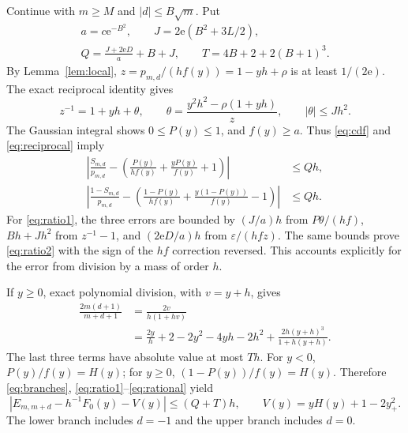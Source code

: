 \documentclass[11pt]{amsart}
\newcommand{\ee}{\mathrm e}
\begin{document}
Continue with $m\ge M$ and $|d|\le B\sqrt m$. Put
\begin{equation}\label{eq:Q}
 \begin{gathered}
 a=c\ee^{-B^2},\qquad J=2\ee(B^2+3L/2),\\
 Q=\frac{J+2\ee D}{a}+B+J,\qquad
 T=4B+2+2(B+1)^3.
 \end{gathered}
\end{equation}
By Lemma~\ref{lem:local},
$z=p_{m,d}/(hf(y))=1-yh+\rho$ is at least $1/(2\ee)$.
The exact reciprocal identity gives
\begin{equation}\label{eq:reciprocal}
 z^{-1}=1+yh+\theta,\qquad
 \theta=\frac{y^2h^2-\rho(1+yh)}{z},\qquad
 |\theta|\le Jh^2.
\end{equation}
The Gaussian integral shows $0\le P(y)\le1$, and $f(y)\ge a$.
Thus \eqref{eq:cdf} and \eqref{eq:reciprocal} imply
\begin{align}
 \left|\frac{S_{m,d}}{p_{m,d}}
 -\left(\frac{P(y)}{hf(y)}+\frac{yP(y)}{f(y)}+1\right)\right|
 &\le Qh,\label{eq:ratio1}\\
 \left|\frac{1-S_{m,d}}{p_{m,d}}
 -\left(\frac{1-P(y)}{hf(y)}+\frac{y(1-P(y))}{f(y)}-1\right)\right|
 &\le Qh.\label{eq:ratio2}
\end{align}
For \eqref{eq:ratio1}, the three errors are bounded by
$(J/a)h$ from $P\theta/(hf)$, $Bh+Jh^2$ from $z^{-1}-1$, and
$(2\ee D/a)h$ from $\varepsilon/(hfz)$. The same bounds prove
\eqref{eq:ratio2} with the sign of the $hf$ correction reversed.
This accounts explicitly for the error from division by a mass of
order $h$.

If $y\ge0$, exact polynomial division, with $v=y+h$, gives
\begin{equation}\label{eq:rational}
 \begin{split}
 \frac{2m(d+1)}{m+d+1}
 &=\frac{2v}{h(1+hv)}\\
 &=\frac{2y}{h}+2-2y^2
       -4yh-2h^2+\frac{2h(y+h)^3}{1+h(y+h)}.
 \end{split}
\end{equation}
The last three terms have absolute value at most $Th$.
For $y<0$, $P(y)/f(y)=H(y)$; for $y\ge0$,
$(1-P(y))/f(y)=H(y)$. Therefore \eqref{eq:branches},
\eqref{eq:ratio1}--\eqref{eq:rational} yield
\begin{equation}\label{eq:grid}
 \left|E_{m,m+d}-h^{-1}F_0(y)-V(y)\right|\le(Q+T)h,
 \qquad V(y)=yH(y)+1-2y_+^2.
\end{equation}
The lower branch includes $d=-1$ and the upper branch includes $d=0$.
\end{document}
